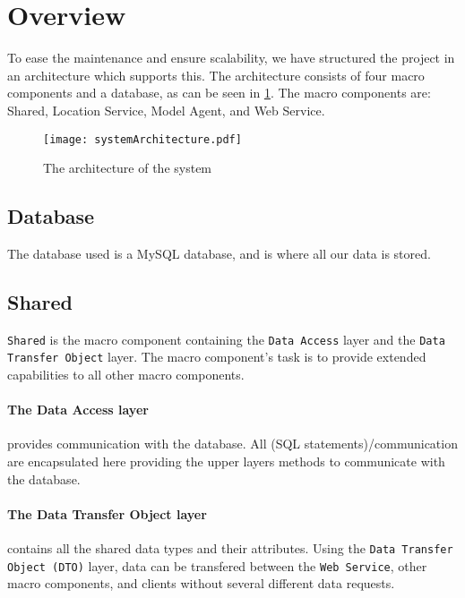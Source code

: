 \section{Overview}
To ease the maintenance and ensure scalability, we have structured the project in an architecture which supports this.
The architecture consists of four macro components and a database, as can be seen in \cref{fig:architecture}. The macro components are: Shared, Location Service, Model Agent, and Web Service.

%

\begin{figure}[H]
\texttt{[image: systemArchitecture.pdf]}
\caption{The architecture of the system}
\label{fig:architecture}
\end{figure}

\subsection*{Database} The database used is a MySQL database, and is where all our data is stored.


\subsection*{Shared}\texttt{Shared} is the macro component containing the \texttt{Data Access} layer and the \texttt{Data Transfer Object} layer.
The macro component's task is to provide extended capabilities to all other macro components.

\paragraph{The Data Access layer} provides communication with the database.
All (SQL statements)/communication are encapsulated here providing the upper layers methods to communicate with the database.

\paragraph{The Data Transfer Object layer} contains all the shared data types and their attributes.
Using the \texttt{Data Transfer Object (DTO)} layer, data can be transfered between the \texttt{Web Service}, other macro components, and clients without several different data requests.


